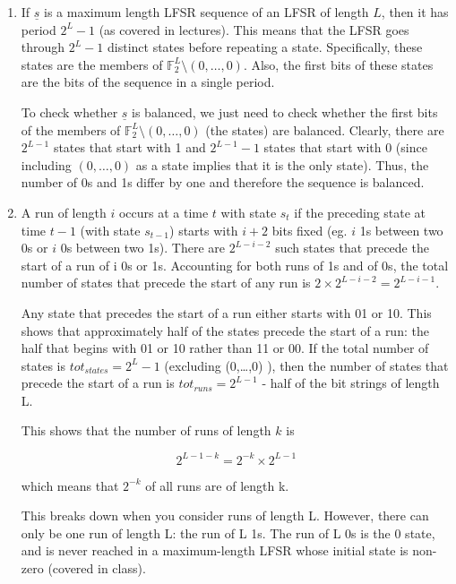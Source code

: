 \usepackage{amsfonts}

\begin{enumerate}

\item If $\underline{s}$ is a maximum length LFSR sequence of an LFSR of length
$L$, then it has period $2^L-1$ (as covered in lectures). This means that the
LFSR goes through $2^L-1$ distinct states before repeating a state.
Specifically, these states are the members of $\mathbb{F}_2^L \setminus
(0,\dots,0)$. Also, the first bits of these states are the bits of the sequence
in a single period.

To check whether $\underline{s}$ is balanced, we just need to check whether the
first bits of the members of $\mathbb{F}_2^L \setminus (0,\dots,0)$ (the states)
are balanced. Clearly, there are $2^{L-1}$ states that start with 1 and
$2^{L-1}-1$ states that start with 0 (since including $(0,\dots,0)$ as a state
implies that it is the only state). Thus, the number of 0s and 1s differ by one
and therefore the sequence is balanced.

\item A run of length $i$ occurs at a time $t$ with state $s_t$ if the preceding
state at time $t-1$ (with state $s_{t-1}$) starts with $i+2$ bits fixed (eg. $i$
1s between two 0s or $i$ 0s between two 1s). There are $2^{L-i-2}$ such states
that precede the start of a run of i 0s or 1s. Accounting for both runs of 1s
and of 0s, the total number of states that precede the start of any run is $2
\times 2^{L-i-2} = 2^{L-i-1}$.

Any state that precedes the start of a run either starts with 01 or 10. This
shows that approximately half of the states precede the start of a run: the half
that begins with 01 or 10 rather than 11 or 00. If the total number of states is
$tot_{states} = 2^L-1$ (excluding (0,\dots,0) ), then the number of states that
precede the start of a run is $tot_{runs} = 2^{L-1}$ - half of the bit strings
of length L.

This shows that the number of runs of length $k$ is

\[2^{L-1-k} = 2^{-k} \times 2^{L-1}\]

which means that $2^{-k}$ of all runs are of length k.

This breaks down when you consider runs of length L. However, there can only be
one run of length L: the run of L 1s. The run of L 0s is the 0 state, and is
never reached in a maximum-length LFSR whose initial state is non-zero (covered
in class).

\end{enumerate}
